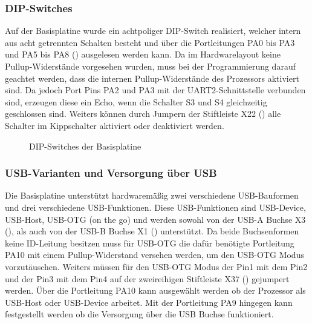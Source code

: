 \subsubsection{DIP-Switches}
\label{sec:basis-dip}
Auf der \gls{Basisplatine} wurde ein achtpoliger DIP-Switch realisiert, welcher intern aus acht getrennten Schalten besteht und über die Portleitungen PA0 bis PA3 und PA5 bis PA8 () ausgelesen werden kann. Da im Hardwarelayout keine Pullup-Widerstände vorgesehen wurden, muss bei der Programmierung darauf geachtet werden, dass die internen Pullup-Widerstände des Prozessors aktiviert sind. Da jedoch Port Pins PA2 und PA3 mit der UART2-Schnittstelle verbunden sind, erzeugen diese ein Echo, wenn die Schalter S3 und S4 gleichzeitig geschlossen sind. Weiters können durch Jumpern der Stiftleiste X22 () alle Schalter im Kippschalter aktiviert oder deaktiviert werden.

\begin{figure}[H]
    \centering
    \qquad
    \qquad
    \caption[DIP-Switches der Basisplatine]{DIP-Switches der \gls{Basisplatine}}
    \label{fig:basisplatine-dip}
\end{figure}

\subsubsection{USB-Varianten und Versorgung über USB}
Die \gls{Basisplatine} unterstützt hardwaremäßig zwei verschiedene USB-Bauformen und drei verschiedene USB-Funktionen. Diese USB-Funktionen sind USB-Device, USB-Host, USB-OTG (on the go) und werden sowohl von der USB-A Buchse X3 (), als auch von der USB-B Buchse X1 () unterstützt. Da beide Buchsenformen keine ID-Leitung besitzen muss für USB-OTG die dafür benötigte Portleitung PA10 mit einem Pullup-Widerstand versehen werden, um den USB-OTG Modus vorzutäuschen. Weiters müssen für den USB-OTG Modus der Pin1 mit dem Pin2 und der Pin3 mit dem Pin4 auf der zweireihigen Stiftleiste X37 () gejumpert werden. Über die Portleitung PA10 kann ausgewählt werden ob der Prozessor als USB-Host oder USB-Device arbeitet. Mit der Portleitung PA9 hingegen kann festgestellt werden ob die Versorgung über die USB Buchse funktioniert.

